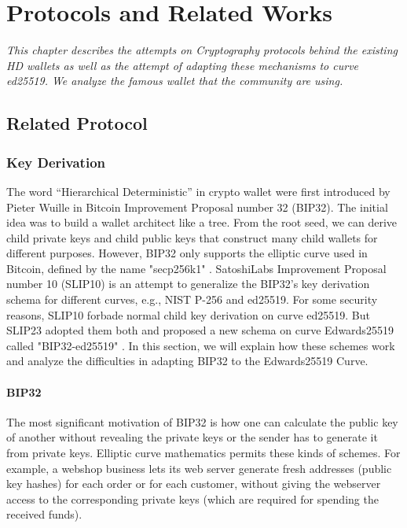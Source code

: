 \chapter{Protocols and Related Works}
\label{chap: Related works}

\textit{This chapter describes the attempts on Cryptography protocols behind the existing HD wallets as
    well as the attempt of adapting these mechanisms to curve ed25519. We analyze the famous wallet that the community are using.}

\minitoc

\section{Related Protocol}
\subsection{Key Derivation}

The word “Hierarchical Deterministic” in crypto wallet were first introduced by Pieter Wuille in Bitcoin Improvement Proposal number 32 (BIP32)\cite{github/bip0032}. The initial idea was to build a wallet architect like a tree. From the root seed, we can derive child private keys and child public keys that construct many child wallets for different purposes. However, BIP32 only supports the elliptic curve used in Bitcoin, defined by the name "secp256k1" \cite{secp256k1}. SatoshiLabs Improvement Proposal number 10 (SLIP10) is an attempt to generalize the BIP32's key derivation schema for different curves, e.g., NIST P-256 and ed25519. For some security reasons, SLIP10 forbade normal child key derivation on curve ed25519. But SLIP23 adopted them both and proposed a new schema on curve Edwards25519 called "BIP32-ed25519" \cite{Khovratovich2017}. In this section, we will explain how these schemes work and analyze the difficulties in adapting BIP32 to the Edwards25519 Curve.

\subsubsection{BIP32}
\label{bip32}
The most significant motivation of BIP32 is how one can calculate the public key of another without revealing the private keys or the sender has to generate it from private keys. Elliptic curve mathematics permits these kinds of schemes. For example, a webshop business lets its web server generate fresh addresses (public key hashes) for each order or for each customer, without giving the webserver access to the corresponding private keys (which are required for spending the received funds).

